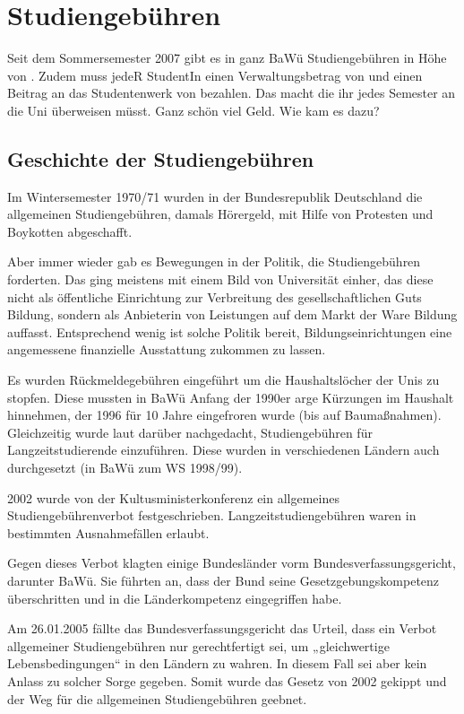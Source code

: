 \section{Studiengebühren}

Seit dem Sommersemester 2007 gibt es in ganz BaWü
Studiengebühren in Höhe von \EUR{\studiengebuehren}. Zudem muss jedeR StudentIn einen
Verwaltungsbetrag von \EUR{\verwaltungsbetrag} und einen Beitrag an das Studentenwerk von \EUR{\studentenwerksbeitrag}
bezahlen. Das macht \EUR{\beitragssumme} die ihr jedes Semester an die Uni überweisen müsst.
Ganz schön viel Geld. Wie kam es dazu?


\subsection*{Geschichte der Studiengebühren}

Im Wintersemester 1970/71 wurden in der Bundesrepublik Deutschland die allgemeinen
Studiengebühren, damals Hörergeld, mit Hilfe von Protesten und Boykotten abgeschafft.

Aber immer wieder gab es Bewegungen in der Politik, die Studiengebühren forderten. Das ging meistens mit einem Bild von Universität einher, das diese nicht als öffentliche Einrichtung zur Verbreitung des gesellschaftlichen Guts Bildung, sondern als Anbieterin von Leistungen auf dem Markt der Ware Bildung auffasst. Entsprechend wenig ist solche Politik bereit, Bildungseinrichtungen eine angemessene finanzielle Ausstattung zukommen zu lassen.

Es wurden Rückmeldegebühren eingeführt um die Haushaltslöcher der Unis zu
stopfen. Diese mussten in BaWü Anfang der 1990er arge Kürzungen im Haushalt hinnehmen, der 1996 für 10 Jahre eingefroren wurde (bis auf Baumaßnahmen).
Gleichzeitig wurde laut darüber nachgedacht, Studiengebühren für Langzeitstudierende einzuführen.
Diese wurden in verschiedenen Ländern auch durchgesetzt (in BaWü zum WS 1998/99).

2002 wurde von der Kultusministerkonferenz ein allgemeines
Studiengebührenverbot festgeschrieben. Langzeitstudiengebühren waren in bestimmten Ausnahmefällen erlaubt.

Gegen dieses Verbot klagten einige Bundesländer vorm Bundesverfassungsgericht, darunter BaWü. Sie
führten an, dass der Bund seine Gesetzgebungskompetenz überschritten und in die Länderkompetenz eingegriffen habe.

Am 26.01.2005 fällte das Bundesverfassungsgericht das Urteil, dass ein Verbot allgemeiner Studiengebühren nur gerechtfertigt sei, um
„gleichwertige Lebensbedingungen“ in den Ländern zu wahren. In diesem Fall sei aber
kein Anlass zu solcher Sorge gegeben. Somit wurde das Gesetz von 2002 gekippt und
der Weg für die allgemeinen Studiengebühren geebnet.


